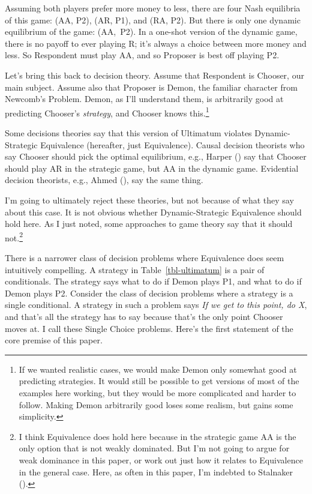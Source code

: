 \documentclass[
  10pt,
  letterpaper,
  DIV=11,
  numbers=noendperiod,
  twoside]{scrartcl}
\begin{document}
Assuming both players prefer more money to less, there are four Nash
equilibria of this game: (AA, P2), (AR, P1), and (RA, P2). But there is
only one dynamic equilibrium of the game: (AA,~P2). In a one-shot
version of the dynamic game, there is no payoff to ever playing R; it's
always a choice between more money and less. So Respondent must play AA,
and so Proposer is best off playing P2.

Let's bring this back to decision theory. Assume that Respondent is
Chooser, our main subject. Assume also that Proposer is Demon, the
familiar character from Newcomb's Problem. Demon, as I'll understand
them, is arbitrarily good at predicting Chooser's \emph{strategy}, and
Chooser knows this.\footnote{If we wanted realistic cases, we would make
  Demon only somewhat good at predicting strategies. It would still be
  possible to get versions of most of the examples here working, but
  they would be more complicated and harder to follow. Making Demon
  arbitrarily good loses some realism, but gains some simplicity.}

Some decisions theories say that this version of Ultimatum violates
Dynamic-Strategic Equivalence (hereafter, just Equivalence). Causal
decision theorists who say Chooser should pick the optimal equilibrium,
e.g., Harper () say that Chooser should
play AR in the strategic game, but AA in the dynamic game. Evidential
decision theorists, e.g., Ahmed (), say
the same thing.

I'm going to ultimately reject these theories, but not because of what
they say about this case. It is not obvious whether Dynamic-Strategic
Equivalence should hold here. As I just noted, some approaches to game
theory say that it should not.\footnote{I think Equivalence does hold
  here because in the strategic game AA is the only option that is not
  weakly dominated. But I'm not going to argue for weak dominance in
  this paper, or work out just how it relates to Equivalence in the
  general case. Here, as often in this paper, I'm indebted to Stalnaker
  ().}

There is a narrower class of decision problems where Equivalence does
seem intuitively compelling. A strategy in Table~\ref{tbl-ultimatum} is
a pair of conditionals. The strategy says what to do if Demon plays P1,
and what to do if Demon plays P2. Consider the class of decision
problems where a strategy is a single conditional. A strategy in such a
problem says \emph{If we get to this point, do X}, and that's all the
strategy has to say because that's the only point Chooser moves at. I
call these Single Choice problems. Here's the first statement of the
core premise of this paper.
\end{document}
